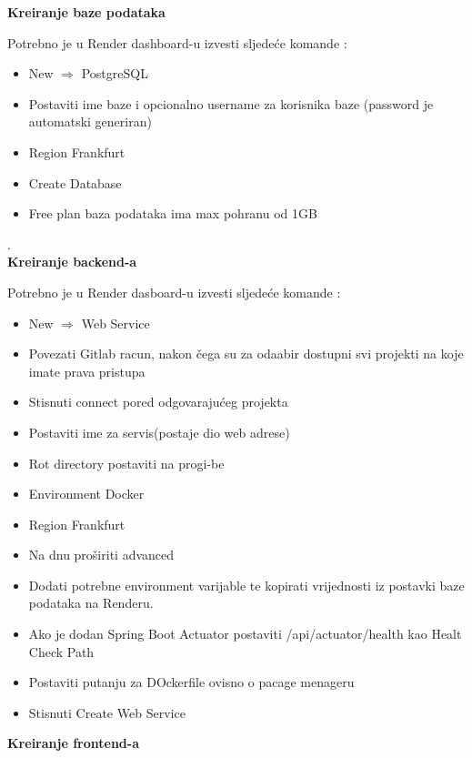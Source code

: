 			\textbf{Kreiranje baze podataka}\\
				{Potrebno je u Render dashboard-u izvesti sljedeće komande :
				\begin{itemize}
					\item New $\Rightarrow$ PostgreSQL
					\item Postaviti ime baze i opcionalno username za korisnika baze (password je automatski generiran)
					\item Region Frankfurt
					\item Create Database
					\item Free plan baza podataka ima max pohranu od 1GB 
			\end{itemize}}.\\
			\textbf{Kreiranje backend-a}\\
				{Potrebno je u Render dasboard-u izvesti sljedeće komande :
					\begin{itemize}
						\item New $\Rightarrow$ Web Service
						\item Povezati Gitlab racun, nakon čega su za odaabir dostupni svi projekti na koje imate prava pristupa
						\item Stisnuti connect pored odgovarajućeg projekta
						\item Postaviti ime za servis(postaje dio web adrese)
						\item Rot directory postaviti na progi-be
						\item Environment Docker
						\item Region Frankfurt
						\item Na dnu proširiti advanced
						\item Dodati potrebne environment varijable te kopirati vrijednosti iz postavki baze podataka na Renderu. 
						\item Ako je dodan Spring Boot Actuator postaviti /api/actuator/health kao Healt Check Path
						\item Postaviti putanju za DOckerfile ovisno o pacage menageru 
						\item Stisnuti Create Web Service
				\end{itemize}}
			\textbf{Kreiranje frontend-a}\\
